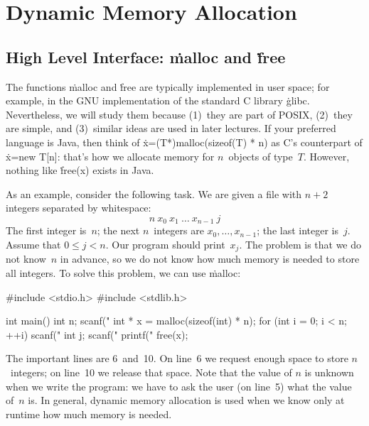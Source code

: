 \chapter{Dynamic Memory Allocation}\label{ch:01-dynamic-memory}


\newcommand\mem[1]{
  \foreach \x in {0,1,...,#1} {
    \draw (\x,0) rectangle (\x+1,1);
  }
}
\newcommand\memnum[1]{
  \foreach \x in {0,1,...,#1} {
    \draw[fill=gray] (\x,0) rectangle node{$\x$} (\x+1,1);
  }
}
\newcommand\memblock[3]{
  \draw[#1,very thick,rounded corners=1pt]
    (#2+0.2,0.2) rectangle (#3-0.2,0.8);
}
\newcommand\use[2]{\memblock{us}{#1}{#2}}
\newcommand\fre[2]{\memblock{fs}{#1}{#2}}
\newcommand\T{\tikz[baseline=2,scale=.4]}

\section{High Level Interface: \.{malloc} and \.{free}}

The functions \.{malloc} and \.{free} are typically implemented in user space;
  for example, in the GNU implementation of the standard C library \.{glibc}.
Nevertheless, we will study them because
  (1)~they are part of POSIX,
  (2)~they are simple, and
  (3)~similar ideas are used in later lectures.
If your preferred language is Java,
  then think of \.{x=(T*)malloc(sizeof(T) * n)} as C's counterpart of \.{x=new T[n]}:
  that's how we allocate memory for $n$~objects of type~$T$.
However,
  nothing like \.{free(x)} exists in Java.

As an example, consider the following task.
We are given a file with $n+2$ integers separated by whitespace:
\[
  n\ x_0\ x_1\ \ldots\ x_{n-1}\ j
\]
The first integer is~$n$;
  the next $n$~integers are $x_0,\ldots,x_{n-1}$;
  the last integer is~$j$.
Assume that $0 \le j < n$.
Our program should print~$x_j$.
The problem is that we do not know~$n$ in advance,
  so we do not know how much memory is needed to store all integers.
To solve this problem, we can use \.{malloc}:
\begin{ccode}
#include <stdio.h>
#include <stdlib.h>

int main() {
  int n; scanf("%
  int * x = malloc(sizeof(int) * n);
  for (int i = 0; i < n; ++i) scanf("%
  int j; scanf("%
  printf("%
  free(x);
}
\end{ccode}
The important lines are 6~and~10.
On line~6 we request enough space to store $n$~integers;
  on line~10 we release that space.
Note that the value of $n$ is unknown when we write the program:
  we have to ask the user (on line~5) what the value of~$n$ is.
In general,
  dynamic memory allocation is used when we know only at runtime how much memory is needed.

